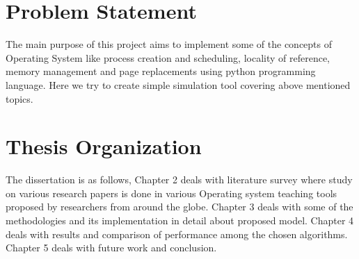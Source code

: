 \begin{onehalfspacing}
\section{Problem Statement}
The main purpose of this project aims to implement some of the concepts of Operating System like process creation and scheduling, locality of reference, memory management and page replacements using python programming language. Here we try to create simple simulation tool covering above mentioned topics.

\section{Thesis Organization}
The dissertation is as follows, Chapter 2 deals with literature survey where study on various research papers is done in various Operating system teaching tools proposed by researchers from around the globe. Chapter 3 deals with some of the methodologies and its implementation in detail about proposed model. Chapter 4 deals with results and comparison of performance among the chosen algorithms. Chapter 5 deals with future work and conclusion.

\end{onehalfspacing}    